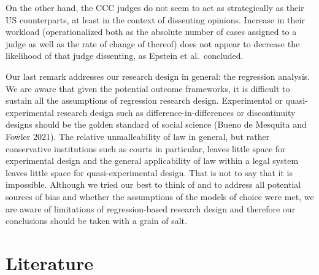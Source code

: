 \documentclass[
  11pt,
]{article}
\begin{document}
On the other hand, the CCC judges do not seem to act as strategically as
their US counterparts, at least in the context of dissenting opinions.
Increase in their workload (operationalized both as the absolute number
of cases assigned to a judge as well as the rate of change of thereof)
does not appear to decrease the likelihood of that judge dissenting, as
Epstein et al.~concluded.

Our last remark addresses our research design in general: the regression
analysis. We are aware that given the potential outcome frameworks, it
is difficult to sustain all the assumptions of regression research
design. Experimental or quasi-experimental research design such as
difference-in-differences or discontinuity designs should be the golden
standard of social science (Bueno de Mesquita and Fowler 2021). The
relative unmalleability of law in general, but rather conservative
institutions such as courts in particular, leaves little space for
experimental design and the general applicability of law within a legal
system leaves little space for quasi-experimental design. That is not to
say that it is impossible. Although we tried our best to think of and to
address all potential sources of bias and whether the assumptions of the
models of choice were met, we are aware of limitations of
regression-based research design and therefore our conclusions should be
taken with a grain of salt.

\vspace{30pt}

\hypertarget{literature}{%
\section*{Literature}\label{literature}}
\end{document}
